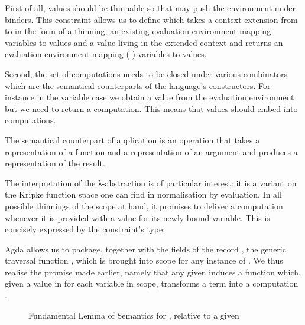 First of all, values should be thinnable so that \semfun{} may push the
environment under binders. This constraint allows us to define 
which takes a context extension from  to  in the form of a
thinning, an existing evaluation environment mapping  variables to
 values and a value living in the extended context  and returns
an evaluation environment mapping ({  }) variables to
 values.



Second, the set of computations needs to be closed under various
combinators which are the semantical counterparts of the language's
constructors.
For instance in the variable case we obtain a value from the evaluation
environment but we need to return a computation. This means that values
should embed into computations.


The semantical counterpart of application is an operation that takes a
representation of a function and a representation of an argument and
produces a representation of the result.


The interpretation of the λ-abstraction is of particular interest:
it is a variant on the Kripke function space one can find in normalisation
by evaluation. In all possible thinnings of the scope at hand, it promises
to deliver a computation whenever it is provided with a value for its newly
bound variable. This is concisely expressed by the constraint's type:




Agda allows us to package, together with the fields of the record
\semrec{}, the generic traversal function \semfun{}, which is brought
into scope for any instance of \semrec{}. We thus realise the promise
made earlier, namely that any given {\semrec{}  } induces
a function which, given a value in  for each variable in scope,
transforms a   term into a computation .

\begin{figure}[h]
\caption{Fundamental Lemma of Semantics for , relative to a given \semrec{}  }\label{figure:fdmlamsem}
\end{figure}

